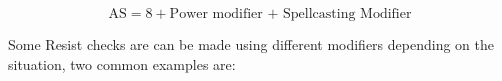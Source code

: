 \begin{landscape}
\begin{multicols}{3}
$$ \text{AS} = 8 + \text{Power modifier + Spellcasting Modifier} $$

Some Resist checks are can be made using different modifiers depending on the situation, two common examples are:
\begin{itemize}
\end{itemize}

\end{multicols}
\end{landscape}
